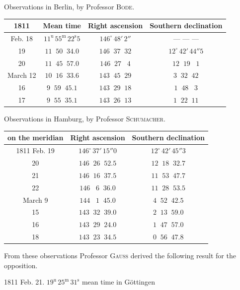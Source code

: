 \begin{center}\fontsize{10}{12}\selectfont\setlength{\tabcolsep}{4pt}\renewcommand{\arraystretch}{1.15}
Observations in Berlin, by Professor \textsc{Bode}.

\begin{tabular}{c|c|c|c}
1811 & Mean time & Right ascension & Southern declination \\
\hline
Feb. 18 & $11^{\mathrm u}\,55^{\mathrm m}\,22^{\mathrm s}5$ & $146^\circ\,48'\,2''$ & --- --- --- \\
19 & $11\;\;50\;\;34.0$ & $146\;\;37\;\;32$ & $12^\circ\,42'\,44''5$ \\
20 & $11\;\;45\;\;57.0$ & $146\;\;27\;\;\;4$ & $12\;\;19\;\;\;1$ \\
March 12 & $10\;\;16\;\;33.6$ & $143\;\;45\;\;29$ & $3\;\;32\;\;42$ \\
16 & $9\;\;59\;\;45.1$ & $143\;\;29\;\;18$ & $1\;\;48\;\;\;3$ \\
17 & $9\;\;55\;\;35.1$ & $143\;\;26\;\;13$ & $1\;\;22\;\;11$ \\
\end{tabular}
\end{center}

\begin{center}\fontsize{10}{12}\selectfont\setlength{\tabcolsep}{4pt}\renewcommand{\arraystretch}{1.15}
Observations in Hamburg, by Professor \textsc{Schumacher}.

\begin{tabular}{c|c|c}
on the meridian & Right ascension & Southern declination \\
\hline
1811 Feb. 19 & $146^\circ\,37'\,15''0$ & $12^\circ\,42'\,45''3$ \\
20 & $146\;\;26\;\;52.5$ & $12\;\;18\;\;32.7$ \\
21 & $146\;\;16\;\;37.5$ & $11\;\;53\;\;47.7$ \\
22 & $146\;\;\;6\;\;36.0$ & $11\;\;28\;\;53.5$ \\
March 9 & $144\;\;\;1\;\;45.0$ & $4\;\;52\;\;42.5$ \\
15 & $143\;\;32\;\;39.0$ & $2\;\;13\;\;59.0$ \\
16 & $143\;\;29\;\;24.0$ & $1\;\;47\;\;57.0$ \\
18 & $143\;\;23\;\;34.5$ & $0\;\;56\;\;47.8$ \\
\end{tabular}
\end{center}


\noindent From these observations Professor \textsc{Gauss} derived the following result for the opposition.
\begin{center}1811 Feb. 21. $19^{\mathrm u}\,25^{\mathrm m}\,31^{\mathrm s}$ mean time in Göttingen\end{center}

